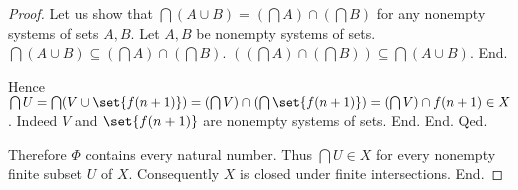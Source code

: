\documentclass[../arithmetic.tex]{subfiles}
\begin{document}
\begin{forthel}
\begin{proof}
              Let us show that $\bigcap (A \cup B) =
              (\bigcap A) \cap (\bigcap B)$ for any nonempty systems of sets
              $A, B$.
                Let $A, B$ be nonempty systems of sets.
                $\bigcap (A \cup B) \subseteq (\bigcap A) \cap (\bigcap B)$.
                $((\bigcap A) \cap (\bigcap B)) \subseteq \bigcap (A \cup B)$. %
              End.

              Hence $\bigcap U
                = \bigcap (V \cup \set{f(n + 1)})
                = (\bigcap V) \cap (\bigcap \set{f(n + 1)})
                = (\bigcap V) \cap f(n + 1)
                \in X$.
              Indeed $V$ and $\set{f(n + 1)}$ are nonempty systems of sets.
            End.
          End.
        Qed.

        Therefore $\Phi$ contains every natural number.
        Thus $\bigcap U \in X$ for every nonempty finite subset $U$ of $X$.
        Consequently $X$ is closed under finite intersections.
      End.
    \end{proof}
  \end{forthel}
\end{document}
